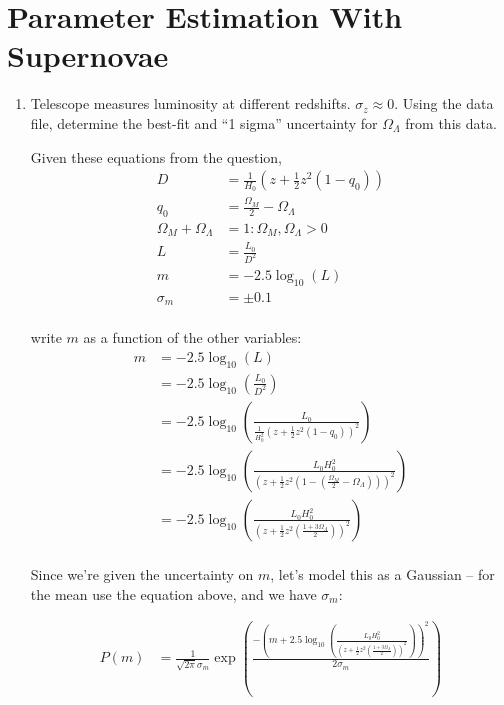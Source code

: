 \section{Parameter Estimation With Supernovae}

\begin{enumerate}[label=\textbf{\Alph*}.]
    \item Telescope measures luminosity at different redshifts.
    $\sigma_z \approx 0$.
    Using the data file, determine the best-fit and ``1 sigma'' uncertainty for $\Omega_\Lambda$ from this data.

    Given these equations from the question,
    \begin{align*}
        D &= \frac{1}{H_0} \left(z + \frac{1}{2}z^2 (1-q_0)\right)\\
        q_0 &= \frac{\Omega_M}{2} - \Omega_\Lambda\\
        \Omega_M + \Omega_\Lambda &= 1: \Omega_M, \Omega_\Lambda > 0\\
        L &= \frac{L_0}{D^2}\\
        m &= -2.5\log_{10}(L)\\
        \sigma_m &= \pm 0.1 \\
    \end{align*}

    write $m$ as a function of the other variables:
    \begin{align*}
        m &= -2.5\log_{10}(L)\\
        &= -2.5\log_{10}\left(\frac{L_0}{D^2}\right)\\
        &= -2.5\log_{10}\left(\frac{L_0}{\frac{1}{H_0^2} \left(z + \frac{1}{2}z^2 (1-q_0)\right)^2}\right)\\
        &= -2.5\log_{10}\left(\frac{L_0H_0^2}{\left(z + \frac{1}{2}z^2 \left(1-\left(\frac{\Omega_M}{2} - \Omega_\Lambda\right)\right)\right)^2}\right)\\
        &= -2.5\log_{10}\left(\frac{L_0H_0^2}{\left(z + \frac{1}{2}z^2 \left(\frac{1 + 3\Omega_\Lambda}{2}\right)\right)^2}\right)\\
    \end{align*}

    Since we're given the uncertainty on $m$, let's model this as a Gaussian -- for the mean use the equation above, and we have $\sigma_m$:

    \begin{align*}
        P(m) &= \frac{1}{\sqrt{2\pi}\sigma_m} \exp\left(\frac{-\left(m + 2.5\log_{10}\left(\frac{L_0H_0^2}{\left(z + \frac{1}{2}z^2 (\frac{1 +3 \Omega_\Lambda}{2})\right)^2}\right)\right)^2}{2\sigma_m}\right)
    \end{align*}
    

\end{enumerate}
